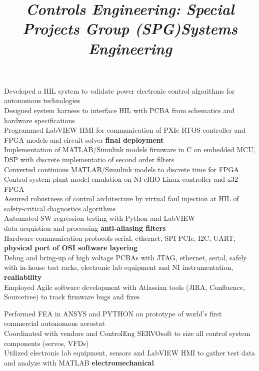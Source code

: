 \documentclass[mm]{res}
\newcommand{\tb}{\textbullet \xspace}
\begin{document}
\begin{resume}
\title{\textsl{Controls Engineering: Special Projects Group (SPG)}}
\begin{position}
\tb Developed a HIL system to validate power electronic control algorithms for autonomous technologies\\
\tb Designed system harness to interface HIL with PCBA from schematics and hardware specifications \\
\tb Programmed LabVIEW HMI for communication of PXIe RTOS controller and FPGA models and circuit solver \textbf{final deployment}\\
\tb Implementation of MATLAB/Simulink models firmware in C on embedded MCU, DSP with discrete implementatio of second order filters\\
\tb Converted continious MATLAB/Simulink models to discrete time for FPGA \\
\tb Control system plant model emulation on NI cRIO Linux controller and x32 FPGA \\
\tb Assured robustness of control architecture by virtual faul injection at HIL of safety-critical diagnostics algorithms \\
\tb Automated SW regression testing with Python and LabVIEW \\
\tb data acquistion and processing \textbf{anti-aliasing filters}\\
\tb Hardware communication protocols serial, ethernet, SPI PCIe, I2C, UART, \textbf{physical port of OSI software layering} \\
\tb Debug and bring-up of high voltage PCBAs with JTAG, ethernet, serial, safely with in-house test racks, electronic lab equipment and NI instrumentation, \textbf{realiability} \\
\tb Employed Agile software development with Atlassian tools (JIRA, Confluence, Sourcetree) to track firmware bugs and fixes
\end{position}

\title{\textsl{Systems Engineering}}
\begin{position}
\tb Performed FEA in ANSYS and PYTHON on prototype of world’s first commercial autonomous aerostat \\
\tb Coordinated with vendors and ControlEng SERVOsoft to size all control system components (servos, VFDs) \\
\tb Utilized electronic lab equipment, sensors and LabVIEW HMI to gather test data and analyze with MATLAB \textbf{electromechanical}
\end{position}


\end{resume}
\end{document}

